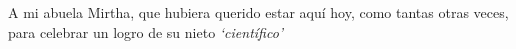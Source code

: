 \begin{dedication}
    A mi abuela Mirtha, que hubiera querido estar aquí hoy, como tantas otras veces, para celebrar un logro de su nieto \emph{`científico'}
\end{dedication}
